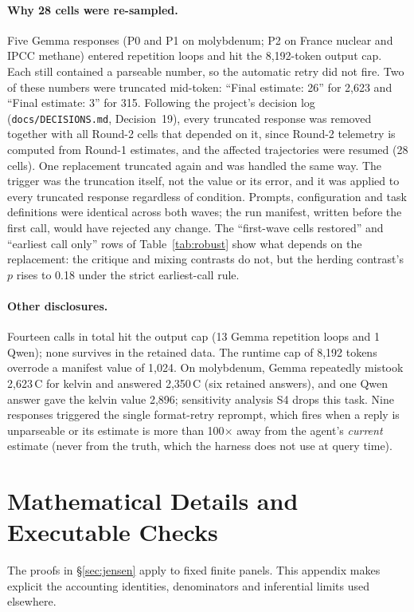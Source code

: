 \documentclass[10pt]{article}
\theoremstyle{manuscript}\newtheorem{proposition}{Proposition}
\begin{document}
\paragraph{Why 28 cells were re-sampled.} Five Gemma responses (P0 and P1 on molybdenum; P2 on France nuclear and IPCC methane) entered repetition loops and hit the 8,192-token output cap. Each still contained a parseable number, so the automatic retry did not fire. Two of these numbers were truncated mid-token: ``Final estimate: 26'' for 2,623 and ``Final estimate: 3'' for 315. Following the project's decision log (\texttt{docs/DECISIONS.md}, Decision~19), every truncated response was removed together with all Round-2 cells that depended on it, since Round-2 telemetry is computed from Round-1 estimates, and the affected trajectories were resumed (28 cells). One replacement truncated again and was handled the same way. The trigger was the truncation itself, not the value or its error, and it was applied to every truncated response regardless of condition. Prompts, configuration and task definitions were identical across both waves; the run manifest, written before the first call, would have rejected any change. The ``first-wave cells restored'' and ``earliest call only'' rows of Table~\ref{tab:robust} show what depends on the replacement: the critique and mixing contrasts do not, but the herding contrast's $p$ rises to 0.18 under the strict earliest-call rule.

\paragraph{Other disclosures.} Fourteen calls in total hit the output cap (13 Gemma repetition loops and 1 Qwen); none survives in the retained data. The runtime cap of 8,192 tokens overrode a manifest value of 1,024. On molybdenum, Gemma repeatedly mistook 2,623\,\textdegree C for kelvin and answered 2,350\,\textdegree C (six retained answers), and one Qwen answer gave the kelvin value 2,896; sensitivity analysis S4 drops this task. Nine responses triggered the single format-retry reprompt, which fires when a reply is unparseable or its estimate is more than 100$\times$ away from the agent's \emph{current} estimate (never from the truth, which the harness does not use at query time).

\FloatBarrier
\section{Mathematical Details and Executable Checks}\label{app:math}
The proofs in \S\ref{sec:jensen} apply to fixed finite panels. This appendix makes explicit the accounting identities, denominators and inferential limits used elsewhere.
\end{document}
